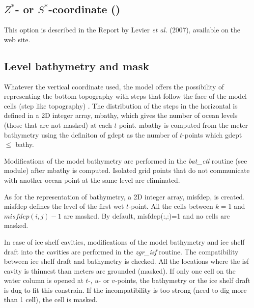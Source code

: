 \documentclass[../main/NEMO_manual]{subfiles}
\begin{document}
\subsection{$Z^*$- or $S^*$-coordinate (\protect{}) }
\label{subsec:DOM_zgr_star}

This option is described in the Report by Levier \textit{et al.} (2007), available on the \NEMO web site. 


\subsection{Level bathymetry and mask}
\label{subsec:DOM_msk}

Whatever the vertical coordinate used,
the model offers the possibility of representing the bottom topography with steps that
follow the face of the model cells (step like topography) \citep{Madec_al_JPO96}.
The distribution of the steps in the horizontal is defined in a 2D integer array, mbathy,
which gives the number of ocean levels (\ie those that are not masked) at each $t$-point.
mbathy is computed from the meter bathymetry using the definiton of gdept as
the number of $t$-points which gdept $\leq$ bathy.

Modifications of the model bathymetry are performed in the \textit{bat\_ctl} routine (see  module) after
mbathy is computed.
Isolated grid points that do not communicate with another ocean point at the same level are eliminated.

As for the representation of bathymetry, a 2D integer array, misfdep, is created.
misfdep defines the level of the first wet $t$-point.
All the cells between $k=1$ and $misfdep(i,j)-1$ are masked.
By default, misfdep(:,:)=1 and no cells are masked.

In case of ice shelf cavities, modifications of the model bathymetry and ice shelf draft into 
the cavities are performed in the \textit{zgr\_isf} routine.
The compatibility between ice shelf draft and bathymetry is checked. 
All the locations where the isf cavity is thinnest than  meters are grounded (\ie masked). 
If only one cell on the water column is opened at $t$-, $u$- or $v$-points,
the bathymetry or the ice shelf draft is dug to fit this constrain.
If the incompatibility is too strong (need to dig more than 1 cell), the cell is masked.\\ 
\end{document}
